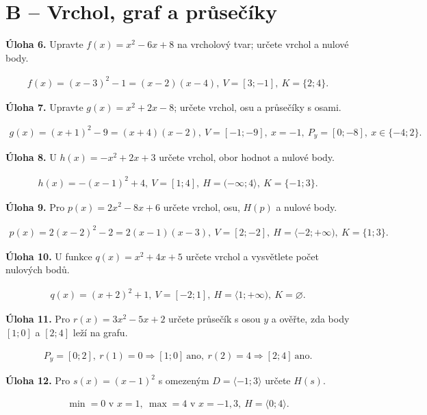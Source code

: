 \documentclass[11pt,a4paper]{article}
\begin{document}
\section*{B – Vrchol, graf a průsečíky}
\noindent\textbf{Úloha 6.} Upravte $f(x)=x^2-6x+8$ na vrcholový tvar; určete vrchol a nulové body.\par
\[\begin{aligned}f(x)=(x-3)^2-1=(x-2)(x-4),\ V=[3;-1],\ K=\{2;4\}.\end{aligned}\]\par
\noindent\textbf{Úloha 7.} Upravte $g(x)=x^2+2x-8$; určete vrchol, osu a průsečíky s osami.\par
\[\begin{aligned}g(x)=(x+1)^2-9=(x+4)(x-2),\ V=[-1;-9],\ x=-1,\ P_y=[0;-8],\ x\in\{-4;2\}.\end{aligned}\]\par
\noindent\textbf{Úloha 8.} U $h(x)=-x^2+2x+3$ určete vrchol, obor hodnot a nulové body.\par
\[\begin{aligned}h(x)=-(x-1)^2+4,\ V=[1;4],\ H=(-\infty;4\rangle,\ K=\{-1;3\}.\end{aligned}\]\par
\noindent\textbf{Úloha 9.} Pro $p(x)=2x^2-8x+6$ určete vrchol, osu, $H(p)$ a nulové body.\par
\[\begin{aligned}p(x)=2(x-2)^2-2=2(x-1)(x-3),\ V=[2;-2],\ H=\langle-2;+\infty),\ K=\{1;3\}.\end{aligned}\]\par
\noindent\textbf{Úloha 10.} U funkce $q(x)=x^2+4x+5$ určete vrchol a vysvětlete počet nulových bodů.\par
\[\begin{aligned}q(x)=(x+2)^2+1,\ V=[-2;1],\ H=\langle1;+\infty),\ K=\varnothing.\end{aligned}\]\par
\noindent\textbf{Úloha 11.} Pro $r(x)=3x^2-5x+2$ určete průsečík s osou $y$ a ověřte, zda body $[1;0]$ a $[2;4]$ leží na grafu.\par
\[\begin{aligned}P_y=[0;2],\ r(1)=0\Rightarrow[1;0]\ \text{ano},\ r(2)=4\Rightarrow[2;4]\ \text{ano}.\end{aligned}\]\par
\noindent\textbf{Úloha 12.} Pro $s(x)=(x-1)^2$ s omezeným $D=\langle-1;3\rangle$ určete $H(s)$.\par
\[\begin{aligned}\min=0\text{ v }x=1,\ \max=4\text{ v }x=-1,3,\ H=\langle0;4\rangle.\end{aligned}\]\par
\end{document}
